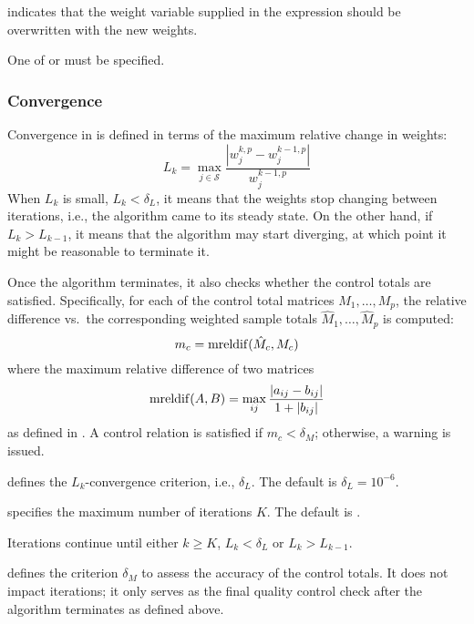 \hangpara
{} indicates that the weight variable supplied in the
\stcmd{[pw=\varname]} expression should be overwritten with the new weights.

\morehang
One of  or  must be specified.

\subsubsection{Convergence}

\begin{sttech}
Convergence in  is defined in terms of the maximum relative
change in weights:
\begin{equation}
    L_k = \max_{j \in \mathcal{S}} \frac{|w_j^{k,p}-w_j^{k-1,p}|}{w_j^{k-1,p}}
    \label{eq:conv:ratio:weights}
\end{equation}
When $L_k$ is small, $L_k < \delta_L$, it means that the weights stop 
changing between iterations, i.e., the algorithm came to its steady state.
On the other hand, if $L_k > L_{k-1}$, it means that the algorithm
may start diverging, at which point it might be reasonable to terminate it.

Once the algorithm terminates, it also checks whether the control totals
are satisfied. Specifically, for each of the control total matrices
$M_1, \ldots, M_p$, the relative difference vs.\ the corresponding weighted
sample totals $\hat M_1, \ldots, \hat M_p$ is computed:
\begin{equation}
    m_c = {\rm mreldif}( \hat M_c, M_c )
    \label{eq:conv:mreldif}
\end{equation}
where the maximum relative difference of two matrices
$$
{\rm mreldif}(A,B) = \max_{ij} \frac{|a_{ij}-b_{ij}|}{1+|b_{ij}|}
$$
as defined in . A control relation is satisfied
if $m_c < \delta_M$; otherwise, a warning is issued.

\end{sttech}

\hangpara
{} defines the $L_k$-convergence
criterion, i.e., $\delta_L$. The default is $\delta_L = 10^{-6}$.

\hangpara
{} specifies the maximum number 
of iterations $K$.
The default is .

\morehang
Iterations continue until either $k \ge K$, $L_k < \delta_L$ or
$L_k > L_{k-1}$.

\hangpara
{} defines the criterion $\delta_M$ to 
assess the accuracy of the control totals. It does not impact
iterations; it only serves as the final quality control check
after the algorithm terminates as defined above.

